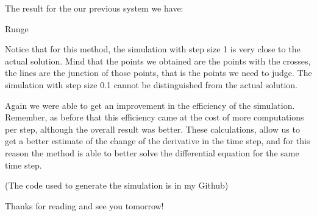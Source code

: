 The result for the our previous system we have:

Runge

Notice that for this method, the simulation with step size 1 is very close to the actual solution. Mind that the points we obtained are the points with the crosses, the lines are the junction of those points, that is the points we need to judge. The simulation with step size 0.1 cannot be distinguished from the actual solution.

Again we were able to get an improvement in the efficiency of the simulation. Remember, as before that this efficiency came at the cost of more computations per step, although the overall result was better. These calculations, allow us to get a better estimate of the change of the derivative in the time step, and for this reason the method is able to better solve the differential equation for the same time step.

(The code used to generate the simulation is in my Github)

Thanks for reading and see you tomorrow!
